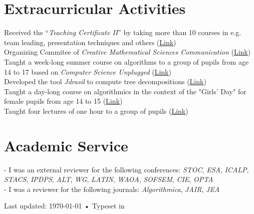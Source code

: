 \documentclass[10pt, a4paper]{article}
\newcommand{\years}[1]{\marginnote{\scriptsize #1}}
\begin{document}
\section*{Extracurricular Activities}
\years{2012--2015}Received the ``\emph{Teaching Certificate II}'' by taking
more than 10 courses in e.g. team leading, presentation techniques and
others (\href{https://www.uni-luebeck.de/universitaet/einrichtungen/dozierenden-service-center/hochschuldidaktik/zertifikatsprogramm.html}{Link})\\
\years{2016}Organizing Commitee of \emph{Creative Mathematical Sciences
  Communication} (\href{http://www.tcs.uni-luebeck.de/cmsc/}{Link})\\
\years{2016}Taught a week-long summer course on algorithms to a group of
pupils from age 14 to 17 based on \emph{Computer Science Unplugged}
(\href{https://www.lias.uni-luebeck.de/veranstaltungen/isc/isc16.html}{Link})\\
\years{2016}Developed the tool \emph{Jdrasil} to compute tree
decompositions (\href{https://github.com/maxbannach/Jdrasil}{Link})\\
\years{2018}Taught a day-long course on algorithmics in the context of the
"Girls' Day" for female pupils from age 14 to 15
(\href{https://www.inf.uni-kiel.de/de/aktuelles/girls-day-am-insitut-fuer-informatik}{Link})\\
\years{2018}Taught four lectures of one hour to a group of pupils (\href{https://www.inf.uni-kiel.de/de/informatik-schule/schnupperstudium/bilder-schnupperstudium/programm-2018}{Link})

\section*{Academic Service}
- I was an external reviewer for the following conferences: \emph{STOC},
\emph{ESA}, \emph{ICALP}, \emph{STACS}, \emph{IPDPS}, \emph{ALT}, \emph{WG},
\emph{LATIN}, \emph{WAOA}, 
 \emph{SOFSEM}, \emph{CIE}, \emph{OPTA}\\
- I was a reviewer for the following journals: \emph{Algorithmica}, \emph{JAIR}, \emph{JEA}





\vspace{-.05cm}
\vfill{}
\begin{center}

{\scriptsize  Last updated: \today\- •\- Typeset in \href{http://nitens.org/taraborelli/cvtex}{
  \XeLaTeX}\\
}
\end{center}
\end{document}
